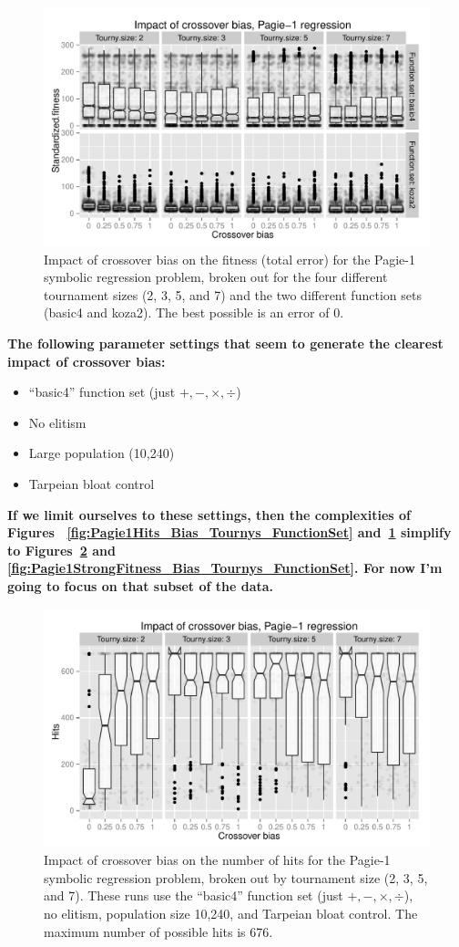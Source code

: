 \documentclass{sig-alternate}
\begin{document}
\begin{figure}
\centering
\includegraphics[width=0.45 \textwidth]{Plots/Pagie_1_Fitness_vs_Bias_Tournys_FunctionSet.pdf}
\caption{Impact of crossover bias on the fitness (total error) for the Pagie-1 symbolic regression problem, broken out 
for the four different tournament sizes (2, 3, 5, and 7) and the two different function sets (basic4 and koza2). The best 
possible is an error of 0.}
\label{fig:Pagie1Fitness_Bias_Tournys_FunctionSet}
\end{figure}

\textbf{The following parameter settings that seem to generate the clearest impact of crossover bias:}
\begin{itemize}
	\item ``basic4'' function set (just $+, -, \times, \div$)
	\item No elitism
	\item Large population (10,240)
	\item Tarpeian bloat control
\end{itemize}
\textbf{If we limit ourselves to these settings, then the complexities of Figures~
\ref{fig:Pagie1Hits_Bias_Tournys_FunctionSet} and~\ref{fig:Pagie1Fitness_Bias_Tournys_FunctionSet} simplify to 
Figures~\ref{fig:Pagie1StrongHits_Bias_Tournys_FunctionSet} and~
\ref{fig:Pagie1StrongFitness_Bias_Tournys_FunctionSet}. For now I'm going to focus on that subset of the data.}

\begin{figure}
\centering
\includegraphics[width=0.45 \textwidth]{Plots/Pagie_1_strong_Hits_vs_Bias_Tournys_FunctionSet.pdf}
\caption{Impact of crossover bias on the number of hits for the Pagie-1 symbolic regression problem, broken out by 
tournament size (2, 3, 5, and 7). These runs use the ``basic4'' function set (just $+, -, \times, \div$), no elitism, 
population size 10,240, and Tarpeian bloat control. The maximum number of possible hits is 676.}
\label{fig:Pagie1StrongHits_Bias_Tournys_FunctionSet}
\end{figure}
\end{document}

